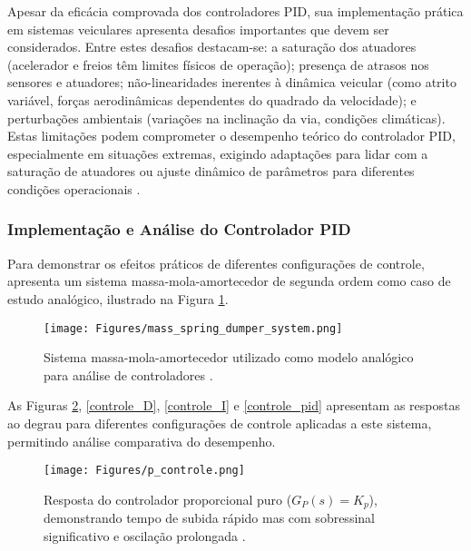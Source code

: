 Apesar da eficácia comprovada dos controladores PID, sua implementação prática em sistemas veiculares apresenta desafios importantes que devem ser considerados. Entre estes desafios destacam-se: a saturação dos atuadores (acelerador e freios têm limites físicos de operação); presença de atrasos nos sensores e atuadores; não-linearidades inerentes à dinâmica veicular (como atrito variável, forças aerodinâmicas dependentes do quadrado da velocidade); e perturbações ambientais (variações na inclinação da via, condições climáticas). Estas limitações podem comprometer o desempenho teórico do controlador PID, especialmente em situações extremas, exigindo adaptações para lidar com a saturação de atuadores ou ajuste dinâmico de parâmetros para diferentes condições operacionais \cite{University_of_Toronto2018-fe}.

\subsubsection{Implementação e Análise do Controlador PID} \label{subsubsec:analise_PID}

Para demonstrar os efeitos práticos de diferentes configurações de controle,  apresenta um sistema massa-mola-amortecedor de segunda ordem como caso de estudo analógico, ilustrado na Figura \ref{Sistema Massa-Mola-Amortecedor}.

\begin{figure}[H]
\centering
\texttt{[image: Figures/mass\_spring\_dumper\_system.png]}
\caption{Sistema massa-mola-amortecedor utilizado como modelo analógico para análise de controladores \cite[Week 5 - Lesson 1: Proportional-Integral-Derivative (PID) Control. ~9min00s]{University_of_Toronto2018-fe}.}
\label{Sistema Massa-Mola-Amortecedor}
\end{figure}

As Figuras \ref{controle_P}, \ref{controle_D}, \ref{controle_I} e \ref{controle_pid} apresentam as respostas ao degrau para diferentes configurações de controle aplicadas a este sistema, permitindo análise comparativa do desempenho.

\begin{figure}[H]
\centering
\texttt{[image: Figures/p\_controle.png]}
\caption{Resposta do controlador proporcional puro ($G_P(s) = K_p$), demonstrando tempo de subida rápido mas com sobressinal significativo e oscilação prolongada \cite[Week 5 - Lesson 1: Proportional-Integral-Derivative (PID) Control. ~12min13s]{University_of_Toronto2018-fe}.}
\label{controle_P}
\end{figure}


